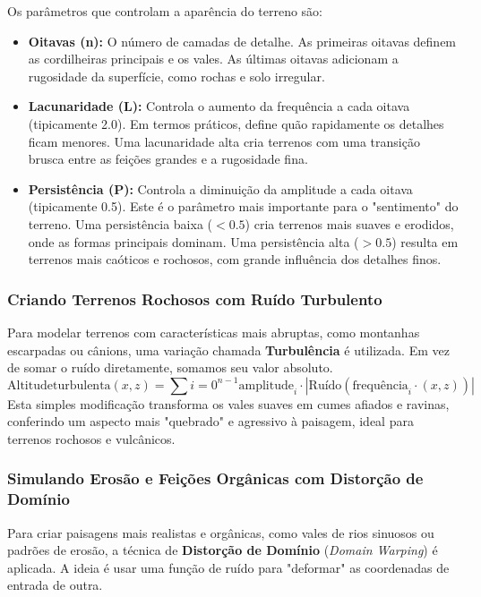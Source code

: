 Os parâmetros que controlam a aparência do terreno são:
\begin{itemize}
\item \textbf{Oitavas (n):} O número de camadas de detalhe. As primeiras oitavas definem as cordilheiras principais e os vales. As últimas oitavas adicionam a rugosidade da superfície, como rochas e solo irregular.
\item \textbf{Lacunaridade (L):} Controla o aumento da frequência a cada oitava (tipicamente 2.0). Em termos práticos, define quão rapidamente os detalhes ficam menores. Uma lacunaridade alta cria terrenos com uma transição brusca entre as feições grandes e a rugosidade fina.

\item \textbf{Persistência (P):} Controla a diminuição da amplitude a cada oitava (tipicamente 0.5). Este é o parâmetro mais importante para o "sentimento" do terreno. Uma persistência baixa ($<0.5$) cria terrenos mais suaves e erodidos, onde as formas principais dominam. Uma persistência alta ($>0.5$) resulta em terrenos mais caóticos e rochosos, com grande influência dos detalhes finos.

\end{itemize}

\subsubsection{Criando Terrenos Rochosos com Ruído Turbulento}
Para modelar terrenos com características mais abruptas, como montanhas escarpadas ou cânions, uma variação chamada \textbf{Turbulência} é utilizada. Em vez de somar o ruído diretamente, somamos seu valor absoluto.
\begin{equation*}
\text{Altitude}{\text{turbulenta}}(x, z) = \sum{i=0}^{n-1} \text{amplitude}_i \cdot |\text{Ruído}(\text{frequência}_i \cdot (x, z))|
\end{equation*}
Esta simples modificação transforma os vales suaves em cumes afiados e ravinas, conferindo um aspecto mais "quebrado" e agressivo à paisagem, ideal para terrenos rochosos e vulcânicos.

\subsubsection{Simulando Erosão e Feições Orgânicas com Distorção de Domínio}
Para criar paisagens mais realistas e orgânicas, como vales de rios sinuosos ou padrões de erosão, a técnica de \textbf{Distorção de Domínio} (\textit{Domain Warping}) é aplicada. A ideia é usar uma função de ruído para "deformar" as coordenadas de entrada de outra.

